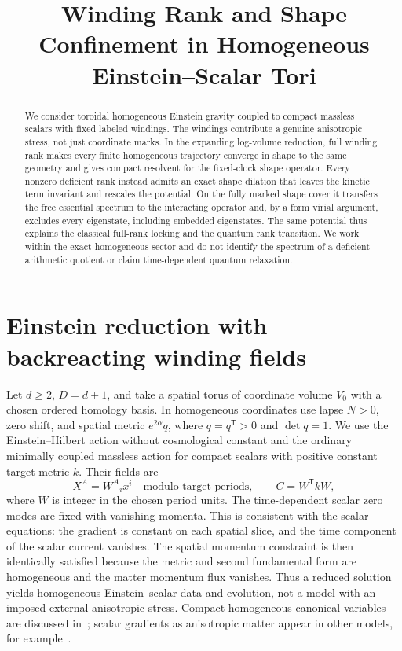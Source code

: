 \documentclass[10pt]{article}
\title{Winding Rank and Shape Confinement in Homogeneous Einstein--Scalar Tori}
\author{}
\date{}
\begin{document}
\maketitle
\begin{abstract}
We consider toroidal homogeneous Einstein gravity coupled to compact massless scalars with fixed labeled windings. The windings contribute a genuine anisotropic stress, not just coordinate marks. In the expanding log-volume reduction, full winding rank makes every finite homogeneous trajectory converge in shape to the same geometry and gives compact resolvent for the fixed-clock shape operator. Every nonzero deficient rank instead admits an exact shape dilation that leaves the kinetic term invariant and rescales the potential. On the fully marked shape cover it transfers the free essential spectrum to the interacting operator and, by a form virial argument, excludes every eigenstate, including embedded eigenstates. The same potential thus explains the classical full-rank locking and the quantum rank transition. We work within the exact homogeneous sector and do not identify the spectrum of a deficient arithmetic quotient or claim time-dependent quantum relaxation.
\end{abstract}

\section{Einstein reduction with backreacting winding fields}

Let $d\ge2$, $D=d+1$, and take a spatial torus of coordinate volume $V_0$ with a chosen ordered homology basis. In homogeneous coordinates use lapse $N>0$, zero shift, and spatial metric $e^{2\alpha}q$, where $q=q^{\mathsf T}>0$ and $\det q=1$. We use the Einstein--Hilbert action without cosmological constant and the ordinary minimally coupled massless action for compact scalars with positive constant target metric $k$. Their fields are
\[
 X^A=W^A{}_i x^i\quad \text{modulo target periods},\qquad
 C=W^{\mathsf T}kW ,
\]
where $W$ is integer in the chosen period units. The time-dependent scalar zero modes are fixed with vanishing momenta. This is consistent with the scalar equations: the gradient is constant on each spatial slice, and the time component of the scalar current vanishes. The spatial momentum constraint is then identically satisfied because the metric and second fundamental form are homogeneous and the matter momentum flux vanishes. Thus a reduced solution yields homogeneous Einstein--scalar data and evolution, not a model with an imposed external anisotropic stress. Compact homogeneous canonical variables are discussed in~\cite{Kodama}; scalar gradients as anisotropic matter appear in other models, for example~\cite{Solid}.
\end{document}
